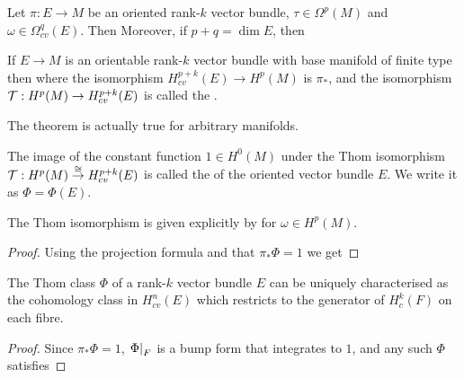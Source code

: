 \documentclass{article}
\begin{document}
\begin{prop}
	Let $\pi:E \to M$ be an oriented rank-$k$ vector bundle, $\tau \in \Omega^p(M)$ and $\omega \in \Omega^q_{cv}(E)$. Then 
	\eq{
		\pi_\ast \pround{(\pi^\ast \tau) \wedge \omega} = \tau \wedge \pi_\ast \omega
	}
	Moreover, if $p+q=\dim E$, then 
\end{prop}

\begin{theorem}
	If $E \to M$ is an orientable rank-$k$ vector bundle with base manifold of finite type then 
	where the isomorphism $H^{p+k}_{cv}(E) \to H^{p}(M)$ is $\pi_\ast$, and the isomorphism $\mathcal{T}:H^p(M) \to H^{p+k}_{cv}(E)$ is called the . 
\end{theorem}

\begin{remark}
	The theorem is actually true for arbitrary manifolds. 
\end{remark}

\begin{definition}
	The image of the constant function $1 \in H^0(M)$ under the Thom isomorphism $\mathcal{T} : H^p(M) \overset{\cong}{\to} H^{p+k}_{cv}(E)$ is called the  of the oriented vector bundle $E$. We write it as $\Phi = \Phi(E)$. 
\end{definition}

\begin{lemma}
	The Thom isomorphism is given explicitly by 
	for $\omega \in H^p(M)$.
\end{lemma}
\begin{proof}
	Using the projection formula and that $\pi_\ast \Phi =1$ we get 
	\eq{
		\pi_\ast \pround{(\pi^\ast \omega)\wedge \Phi} = \omega \wedge \pi_\ast \Phi = \omega	
	}
\end{proof}

\begin{prop}
	The Thom class $\Phi$ of a rank-$k$ vector bundle $E$ can be uniquely characterised as the cohomology class in $H_{cv}^n(E)$ which restricts to the generator of $H_c^k(F)$ on each fibre. 
\end{prop}
\begin{proof}
	Since $\pi_\ast \Phi =1$, $\left. \Phi \right\rvert_{F}$ is a bump form that integrates to $1$, and any such $\Phi$ satisfies 
	\eq{
		\pi_\ast \pround{(\pi^\ast \omega)\wedge \Phi} = \omega \wedge \pi_\ast \Phi = \omega	
	}
\end{proof}
\end{document}
